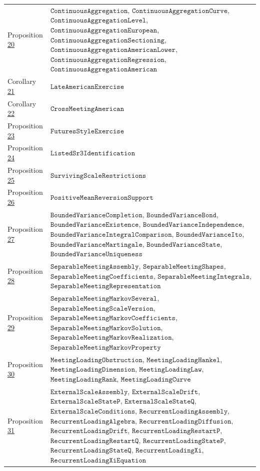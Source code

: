 \documentclass[11pt]{article}
\begin{document}
{\begin{longtable}{lP{384pt}}
Proposition \hyperref[res:Proposition-20]{20} & \(\texttt{ContinuousAggregation}\), \(\texttt{ContinuousAggregationCurve}\), \(\texttt{ContinuousAggregationLevel}\), \(\texttt{ContinuousAggregationEuropean}\), \(\texttt{ContinuousAggregationSectioning}\), \(\texttt{ContinuousAggregationAmericanLower}\), \(\texttt{ContinuousAggregationRegression}\), \(\texttt{ContinuousAggregationAmerican}\) \\
Corollary \hyperref[res:Corollary-21]{21} & \(\texttt{LateAmericanExercise}\) \\
Corollary \hyperref[res:Corollary-22]{22} & \(\texttt{CrossMeetingAmerican}\) \\
Proposition \hyperref[res:Proposition-23]{23} & \(\texttt{FuturesStyleExercise}\) \\
Proposition \hyperref[res:Proposition-24]{24} & \(\texttt{ListedSr3Identification}\) \\
Proposition \hyperref[res:Proposition-25]{25} & \(\texttt{SurvivingScaleRestrictions}\) \\
Proposition \hyperref[res:Proposition-26]{26} & \(\texttt{PositiveMeanReversionSupport}\) \\
Proposition \hyperref[res:Proposition-27]{27} & \(\texttt{BoundedVarianceCompletion}\), \(\texttt{BoundedVarianceBond}\), \(\texttt{BoundedVarianceExistence}\), \(\texttt{BoundedVarianceIndependence}\), \(\texttt{BoundedVarianceIntegralComparison}\), \(\texttt{BoundedVarianceIto}\), \(\texttt{BoundedVarianceMartingale}\), \(\texttt{BoundedVarianceState}\), \(\texttt{BoundedVarianceUniqueness}\) \\
Proposition \hyperref[res:Proposition-28]{28} & \(\texttt{SeparableMeetingAssembly}\), \(\texttt{SeparableMeetingShapes}\), \(\texttt{SeparableMeetingCoefficients}\), \(\texttt{SeparableMeetingIntegrals}\), \(\texttt{SeparableMeetingRepresentation}\) \\
Proposition \hyperref[res:Proposition-29]{29} & \(\texttt{SeparableMeetingMarkovSeveral}\), \(\texttt{SeparableMeetingScaleVersion}\), \(\texttt{SeparableMeetingMarkovCoefficients}\), \(\texttt{SeparableMeetingMarkovSolution}\), \(\texttt{SeparableMeetingMarkovRealization}\), \(\texttt{SeparableMeetingMarkovProperty}\) \\
Proposition \hyperref[res:Proposition-30]{30} & \(\texttt{MeetingLoadingObstruction}\), \(\texttt{MeetingLoadingHankel}\), \(\texttt{MeetingLoadingDimension}\), \(\texttt{MeetingLoadingLaw}\), \(\texttt{MeetingLoadingRank}\), \(\texttt{MeetingLoadingCurve}\) \\
Proposition \hyperref[res:Proposition-31]{31} & \(\texttt{ExternalScaleAssembly}\), \(\texttt{ExternalScaleDrift}\), \(\texttt{ExternalScaleStateP}\), \(\texttt{ExternalScaleStateQ}\), \(\texttt{ExternalScaleConditions}\), \(\texttt{RecurrentLoadingAssembly}\), \(\texttt{RecurrentLoadingAlgebra}\), \(\texttt{RecurrentLoadingDiffusion}\), \(\texttt{RecurrentLoadingDrift}\), \(\texttt{RecurrentLoadingRestartP}\), \(\texttt{RecurrentLoadingRestartQ}\), \(\texttt{RecurrentLoadingStateP}\), \(\texttt{RecurrentLoadingStateQ}\), \(\texttt{RecurrentLoadingXi}\), \(\texttt{RecurrentLoadingXiEquation}\) \\

\end{longtable}}
\end{document}

